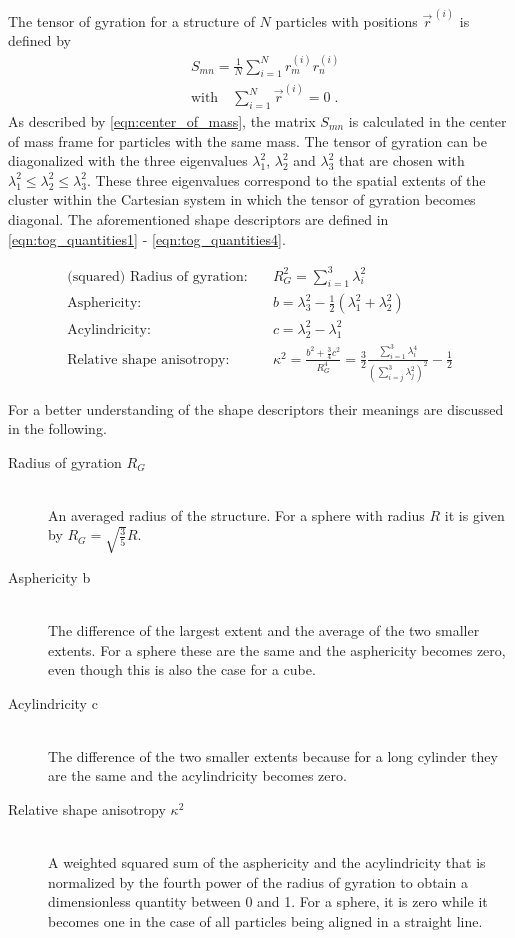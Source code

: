 The tensor of gyration for a structure of $N$ particles with positions $\vec{r}^{\,(i)}$ is defined by
\begin{align}
\label{eqn:tensor_of_gyration}
&S_{mn}=\frac{1}{N} \sum_{i=1}^{N} r^{(i)}_m r^{(i)}_n\\
\label{eqn:center_of_mass}
&\text{with} \quad \sum_{i=1}^{N} \vec{r}^{(i)} = 0 \; \text{.}
\end{align}
As described by \autoref{eqn:center_of_mass}, the matrix $S_{mn}$ is calculated in the center of mass frame for particles with the same mass. The tensor of gyration can be diagonalized with the three eigenvalues $\lambda_1^2$, $\lambda_2^2$ and $\lambda_3^2$ that are chosen with $\lambda_1^2 \leq \lambda_2^2 \leq \lambda_3^2 $. These three eigenvalues correspond to the spatial extents of the cluster within the Cartesian system in which the tensor of gyration becomes diagonal. The aforementioned shape descriptors are defined in \autoref{eqn:tog_quantities1} - \ref{eqn:tog_quantities4}.

\begin{align}
\label{eqn:tog_quantities1}
\text{(squared) Radius of gyration:} \quad &R_G^2 = \sum_{i=1}^3 \lambda_i^2\\
\label{eqn:tog_quantities2}
\text{Asphericity:} \quad &b = \lambda_3^2 - \frac{1}{2}(\lambda_1^2+\lambda_2^2)\\
\label{eqn:tog_quantities3}
\text{Acylindricity:} \quad &c = \lambda_2^2 - \lambda_1^2\\
\label{eqn:tog_quantities4}
\text{Relative shape anisotropy:} \quad &\kappa^2 = \frac{b^2 + \frac{3}{4} c^2 }{R_G^4} =  \frac{3}{2} \frac{ \sum_{i=1}^3 \lambda_i^4 }{\left(\sum_{i=j}^3 \lambda_j^2 \right) ^2 } - \frac{1}{2}
\end{align}

For a better understanding of the shape descriptors their meanings are discussed in the following.

\begin{description}
\item[Radius of gyration $R_G$] \hfill \\ An averaged radius of the structure. For a sphere with radius $R$ it is given by $R_G = \sqrt{\frac{3}{5}} R$.
\item[Asphericity b]\hfill \\ The difference of the largest extent and the average of the two smaller extents. For a sphere these are the same and the asphericity becomes zero, even though this is also the case for a cube.  
\item[Acylindricity c] \hfill \\ The difference of the two smaller extents because for a long cylinder they are the same and the acylindricity becomes zero.
\item[Relative shape anisotropy $\kappa^2$] \hfill \\ A weighted squared sum of the asphericity and the acylindricity that is normalized by the fourth power of the radius of gyration to obtain a dimensionless quantity between 0 and 1. For a sphere, it is zero while it becomes one in the case of all particles being aligned in a straight line.
\end{description}

